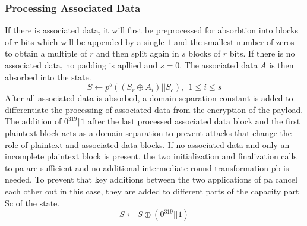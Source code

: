 \subsubsection{Processing Associated Data}
If there is associated data, it will first be preprocessed for absorbtion into blocks of $r$ bits which will be appended by a single $1$ and the smallest number of zeros to obtain a multiple of $r$ and then split again in $s$ blocks of $r$ bits. If there is no associated data, no padding is apllied and $s=0$.
The associated data $A$ is then absorbed into the state.
$$ S \leftarrow p^b((S_r \oplus A_i) || S_c),\ \ 1 \leq i \leq s$$
After all associated data is absorbed, a domain separation constant is added to differentiate the processing of associated data from the encryption of the payload. 
\cite[Chapter 2.4.2]{Ascon-v1.2} \newline
The addition of $0^{319} \Vert 1$ after the last processed associated data block and the ﬁrst plaintext block acts as a domain separation to prevent attacks that change the role of plaintext and associated data blocks. If no associated data and only an incomplete plaintext block is present, the two initialization and ﬁnalization calls to pa are suﬃcient and no additional intermediate round transformation pb is needed. To prevent that key additions between the two applications of pa cancel each other out in this case, they are added to diﬀerent parts of the capacity part Sc of the state. \cite[Chapter 5.1.1]{Ascon-v1.2}
$$S \leftarrow S \oplus (0^{319} || 1)$$

